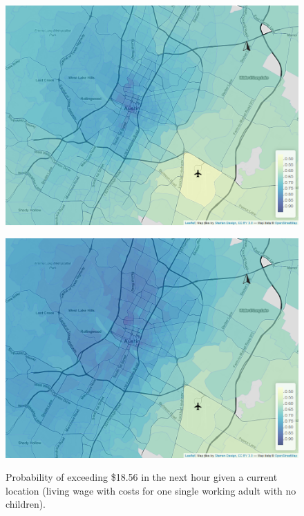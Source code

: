 \begin{figure}[htb]
\begin{minipage}[t]{0.48\linewidth}
        \label{fig:wages:appendix1:b}
    \end{minipage}\hfill
    \begin{minipage}[t]{.48\linewidth}
        \centering
        \includegraphics[width=\linewidth]{img/tailprob_18_56__142.png}
        \label{fig:wages:appendix1:c}
    \end{minipage}
    \begin{minipage}[t]{0.48\linewidth}
        \centering
        \includegraphics[width=\linewidth]{img/tailprob_18_56__168.png}
        \label{fig:wages:appendix1:d}
    \end{minipage}
    \caption{Probability of exceeding \$18.56 in the next hour given a current location (living wage with costs for one single working adult with no children).}
    \label{fig:wages:appendix1}
\end{figure}


